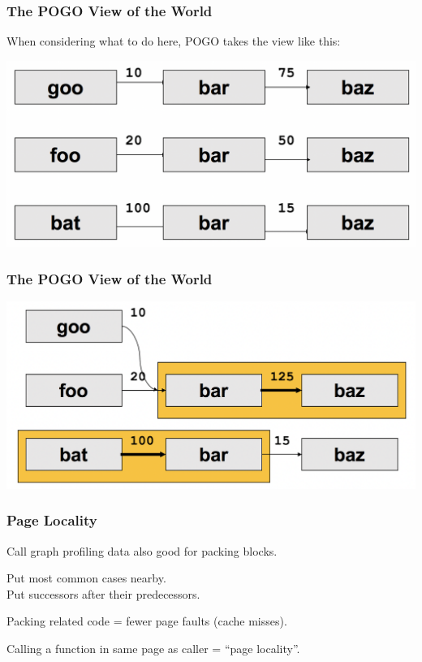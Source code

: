 \begin{frame}
\frametitle{The POGO View of the World}

When considering what to do here, POGO takes the view like this:

\begin{center}
	\includegraphics[width=\textwidth]{images/callpaths3.png}
\end{center}

\end{frame}



\begin{frame}
\frametitle{The POGO View of the World}

\begin{center}
	\includegraphics[width=\textwidth]{images/callpaths4.png}
\end{center}

\end{frame}




\begin{frame}
\frametitle{Page Locality}


\begin{changemargin}{1cm}
Call graph profiling data also good for packing blocks.

Put most common cases nearby.\\
Put successors after their predecessors.

Packing related code = fewer page faults (cache misses).

Calling a function in same page as caller =  ``page locality''.
\end{changemargin}

\end{frame}



